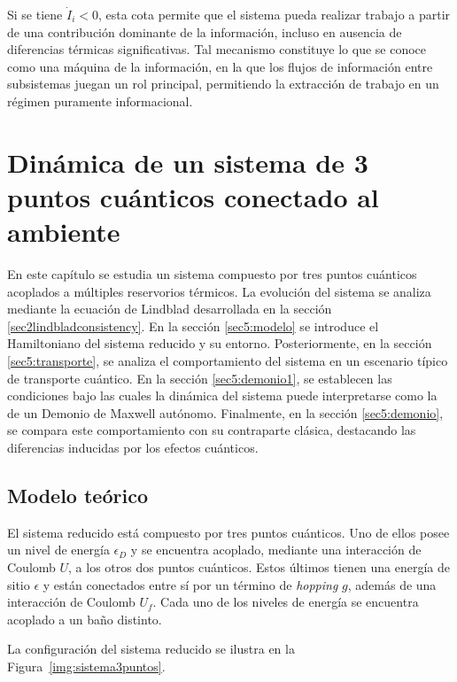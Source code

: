 Si se tiene $\dot{I}_{i}<0$, esta cota permite que el sistema pueda realizar trabajo a partir de una contribución dominante de la información, incluso en ausencia de diferencias térmicas significativas. Tal mecanismo constituye lo que se conoce como una máquina de la información, en la que los flujos de información entre subsistemas juegan un rol principal, permitiendo la extracción de trabajo en un régimen puramente informacional.


\label{sec4:flujos0}

\chapter{Dinámica de un sistema de 3 puntos cuánticos conectado al ambiente}
En este capítulo se estudia un sistema compuesto por tres puntos cuánticos acoplados a múltiples reservorios térmicos. La evolución del sistema se analiza mediante la ecuación de Lindblad desarrollada en la sección \ref{sec2lindbladconsistency}. En la sección \ref{sec5:modelo} se introduce el Hamiltoniano del sistema reducido y su entorno. Posteriormente, en la sección \ref{sec5:transporte}, se analiza el comportamiento del sistema en un escenario típico de transporte cuántico. En la sección \ref{sec5:demonio1}, se establecen las condiciones bajo las cuales la dinámica del sistema puede interpretarse como la de un Demonio de Maxwell autónomo. Finalmente, en la sección \ref{sec5:demonio}, se compara este comportamiento con su contraparte clásica, destacando las diferencias inducidas por los efectos cuánticos.

\section{Modelo teórico}
El sistema reducido está compuesto por tres puntos cuánticos. Uno de ellos posee un nivel de energía $\epsilon_D$ y se encuentra acoplado, mediante una interacción de Coulomb $U$, a los otros dos puntos cuánticos. Estos últimos tienen una energía de sitio $\epsilon$ y están conectados entre sí por un término de \textit{hopping} $g$, además de una interacción de Coulomb $U_f$. Cada uno de los niveles de energía se encuentra acoplado a un baño distinto. 

La configuración del sistema reducido se ilustra en la Figura~\ref{img:sistema3puntos}.



